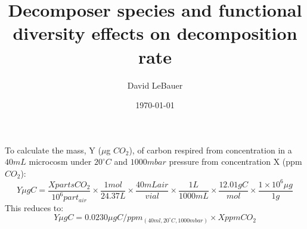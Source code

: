\documentclass[a4paper,12pt]{article}
\title{Decomposer species and functional diversity effects on decomposition rate}
\author{David LeBauer}
\date{\today}
\begin{document}
To calculate the mass, Y ($\mu$g $CO_2$), of carbon respired from concentration in a $40mL$ microcosm under $20^{\circ}C$ and $1000 mbar$ pressure from concentration X (ppm $CO_2$):
$$ Y \mu g C = \frac{X parts CO_2}{10^6 part_{air}}\times\frac{1 mol}{24.37 L}\times\frac{40mL air}{vial}\times\frac{1 L}{1000 mL}\times\frac{12.01 g C}{mol}\times\frac{1 \times 10^6 \mu g}{1 g}$$
This reduces to:
$$  Y \mu g C = 0.0230 \mu g C/ppm_{(40ml, 20^{\circ}C,1000mbar)}\times X ppm CO_2$$
\end{document}

